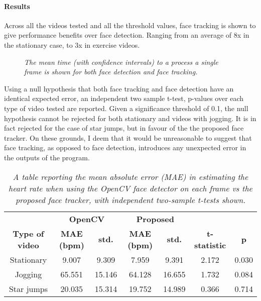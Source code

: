 \paragraph{Results}
Across all the videos tested and all the threshold values, face tracking is shown to give performance benefits over face detection.
Ranging from an average of 8x in the stationary case, to 3x in exercise videos.
\begin{figure}
    \centering
    \scalebox{0.8}{}
   \caption{\textit{The mean time (with confidence intervals) to a process a single frame is shown for both face detection and face tracking.}} 
\end{figure}
\noindent
Using a null hypothesis that both face tracking and face detection have an identical expected error, an independent two sample t-test, p-values over each type of video tested are reported.
Given a significance threshold of 0.1, the null hypothesis cannot be rejected for both stationary and videos with jogging.
It is in fact rejected for the case of star jumps, but in favour of the the proposed face tracker.
On these grounds, I deem that it would be unreasonable to suggest that face tracking, as 
opposed to face detection, introduces any unexpected error in the outputs of the program.
%     
\begin{table}
    \begin{tabular}{c|cc|cc|cc}
    \multicolumn{1}{l|}{} & \multicolumn{2}{c}{\textbf{OpenCV}} & \multicolumn{2}{c|}{\textbf{Proposed}} & \multicolumn{1}{l}{} & \multicolumn{1}{l}{} \\
    \textbf{Type of video} & \textbf{MAE (bpm)} & \textbf{std.} & \textbf{MAE (bpm)} & \textbf{std.} & \textbf{t-statistic} & \textbf{p} \\ \hline
    Stationary & 9.007 & 9.309 & 7.959 & 9.391 & 2.172 & 0.030 \\
    Jogging & 65.551 & 15.146 & 64.128 & 16.655 & 1.732 & 0.084 \\
    \rowcolor[HTML]{EFEFEF} 
    Star jumps & 20.035 & 15.314 & 19.752 & 14.989 & 0.366 & 0.714 \\ \hline
    \end{tabular}
    \caption{\textit{A table reporting the mean absolute error (MAE) in estimating the heart rate when using the OpenCV face detector on each frame vs the proposed face tracker, with independent two-sample t-tests shown. }}
    \end{table}

